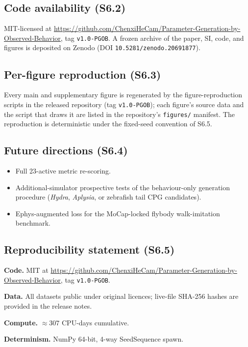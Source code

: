 \documentclass[11pt]{article}
\begin{document}
\subsection{Code availability (S6.2)}
MIT-licensed at \url{https://github.com/ChenxiHeCam/Parameter-Generation-by-Observed-Behavior}, tag \texttt{v1.0-PGOB}. A frozen archive of the paper, SI, code, and figures is deposited on Zenodo (DOI \texttt{10.5281/zenodo.20691877}).

\subsection{Per-figure reproduction (S6.3)}
Every main and supplementary figure is regenerated by the figure-reproduction scripts in the released repository (tag \texttt{v1.0-PGOB}); each figure's source data and the script that draws it are listed in the repository's \texttt{figures/} manifest. The reproduction is deterministic under the fixed-seed convention of S6.5.

\subsection{Future directions (S6.4)}
\begin{itemize}\itemsep0pt
  \item Full 23-active metric re-scoring.
  \item Additional-simulator prospective tests of the behaviour-only generation procedure (\emph{Hydra}, \emph{Aplysia}, or zebrafish tail CPG candidates).
  \item Ephys-augmented loss for the MoCap-locked flybody walk-imitation benchmark.
\end{itemize}

\subsection{Reproducibility statement (S6.5)}
\label{si:repro_statement}

\textbf{Code.} MIT at \url{https://github.com/ChenxiHeCam/Parameter-Generation-by-Observed-Behavior}, tag \texttt{v1.0-PGOB}.

\textbf{Data.} All datasets public under original licences; live-file SHA-256 hashes are provided in the release notes.

\textbf{Compute.} $\approx 307$ CPU-days cumulative.

\textbf{Determinism.} NumPy 64-bit, 4-way SeedSequence spawn.
\end{document}
